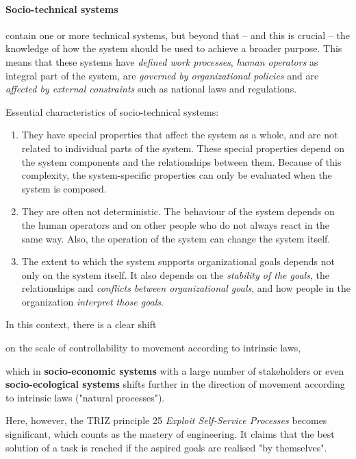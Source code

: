 \documentclass[11pt,a4paper]{article}
\begin{document}
\paragraph{Socio-technical systems}
contain one or more technical systems, but beyond that -- and this is crucial
-- the knowledge of how the system should be used to achieve a broader
purpose.  This means that these systems have \emph{defined work processes},
\emph{human operators} as integral part of the system, are \emph{governed by
  organizational policies} and are \emph{affected by external constraints}
such as national laws and regulations.

Essential characteristics of socio-technical systems:
\begin{enumerate}
\item They have special properties that affect the system as a whole, and are
  not related to individual parts of the system. These special properties
  depend on the system components and the relationships between them. Because
  of this complexity, the system-specific properties can only be evaluated
  when the system is composed.
\item They are often not deterministic. The behaviour of the system depends on
  the human operators and on other people who do not always react in the same
  way. Also, the operation of the system can change the system itself.
\item The extent to which the system supports organizational goals depends not
  only on the system itself. It also depends on the \emph{stability of the
    goals}, the relationships and \emph{conflicts between organizational
    goals}, and how people in the organization \emph{interpret those goals}.
\end{enumerate}

In this context, there is a clear shift 
\begin{center}
  on the scale of controllability to movement according to intrinsic laws,
\end{center}
which in \textbf{socio-economic systems} with a large number of stakeholders
or even \textbf{socio-ecological systems} shifts further in the direction of
movement according to intrinsic laws ("natural processes").

Here, however, the TRIZ principle 25 \emph{Exploit Self-Service Processes}
becomes significant, which counts as the mastery of engineering.  It claims
that the best solution of a task is reached if the aspired goals are realised
"by themselves".
\end{document}
